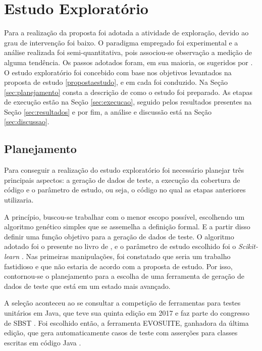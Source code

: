 \chapter[Estudo Exploratório]{Estudo Exploratório}
\label{estudoexploratorio} 

Para a realização da proposta foi adotada a atividade de exploração, devido ao grau de intervenção foi baixo. O paradigma empregado foi experimental e a análise realizada foi semi-quantitativa, pois associou-se observação a medição de alguma tendência. Os passos adotados foram, em sua maioria, os sugeridos por . O estudo exploratório foi concebido com base nos objetivos levantados na proposta de estudo \ref{propostaestudo}, e em cada foi conduzido. Na Seção \ref{sec:planejamento} consta a descrição de como o estudo foi preparado. As etapas de execução estão na Seção \ref{sec:execucao}, seguido pelos resultados presentes na Seção \ref{sec:resultados} e por fim, a análise e discussão está na Seção \ref{sec:discussao}.

\section{Planejamento \label{sec:planejamento}}

Para conseguir a realização do estudo exploratório foi necessário planejar três principais aspectos: a geração de dados de teste, a execução da cobertura de código e o parâmetro de estudo, ou seja, o código no qual as etapas anteriores utilizaria.

A princípio, buscou-se trabalhar com o menor escopo possível, escolhendo um algoritmo genético simples que se assemelha a definição formal. E a partir disso definir uma função objetivo para a geração de dados de teste. O algoritmo adotado foi o presente no livro de \cite{russell2016artificial}, e o parâmetro de estudo escolhido foi o \textit{Scikit-learn} \cite{pedregosa2011scikit}. Nas primeiras manipulações, foi constatado que seria um trabalho fastidioso e que não estaria de acordo com a proposta de estudo. Por isso, contornou-se o planejamento para a escolha de uma ferramenta de geração de dados de teste que está em um estado mais avançado. 

A seleção aconteceu ao se consultar a competição de ferramentas para testes unitários em Java, que teve sua quinta edição em 2017 e faz parte do congresso de SBST \cite{panichella2017java}. Foi escolhido então, a ferramenta EVOSUITE\footnotemark {}, ganhadora da última edição, que gera automaticamente casos de teste com asserções para classes escritas em código Java \cite{fraser2011evosuite}. 

